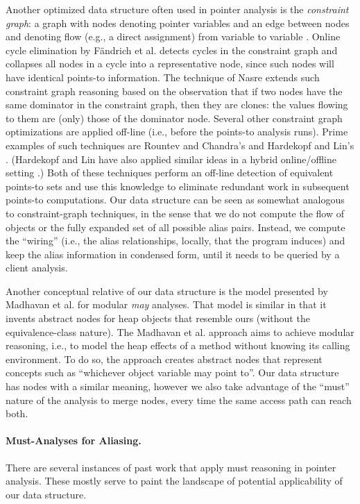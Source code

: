 Another optimized data structure often used in pointer analysis is the
\emph{constraint graph}: a graph with nodes denoting pointer variables
and an edge between nodes  and  denoting flow (e.g., a
direct assignment) from variable  to variable .  Online
cycle elimination by F\"{a}ndrich et al.
\cite{pldi/FahndrichFSA98} detects cycles in the
constraint graph and collapses all nodes in a cycle into a
representative node, since such nodes will have identical points-to
information. The technique of Nasre
\cite{ismm/Nasre12} extends such constraint graph
reasoning based on the observation that if two nodes have the same
dominator in the constraint graph, then they are clones: the values
flowing to them are (only) those of the dominator node. Several other
constraint graph optimizations are applied off-line (i.e., before the
points-to analysis runs).  Prime examples of such techniques are
Rountev and Chandra's \cite{rountevOffline} and Hardekopf and Lin's
\cite{hardekopfOffline}. (Hardekopf and Lin have also applied similar
ideas in a hybrid online/offline setting \cite{antgrasshopper}.)  Both
of these techniques perform an off-line detection of equivalent
points-to sets and use this knowledge to eliminate redundant work in
subsequent points-to computations. Our data structure can be seen as
somewhat analogous to constraint-graph techniques, in the sense that
we do not compute the flow of objects or the fully expanded set of all
possible alias pairs. Instead, we compute the ``wiring'' (i.e., the
alias relationships, locally, that the program induces) and keep the
alias information in condensed form, until it needs to be queried by a
client analysis.

Another conceptual relative of our data structure is the model
presented by Madhavan et al. \cite{PGL-020} for modular \emph{may}
analyses. That model is similar in that it invents abstract nodes for
heap objects that resemble ours (without the equivalence-class
nature). The Madhavan et al. approach aims to achieve modular
reasoning, i.e., to model the heap effects of a method without knowing
its calling environment. To do so, the approach creates abstract
nodes that represent concepts such as ``whichever object variable
 may point to''. Our data structure has nodes with a similar
meaning, however we also take advantage of the ``must'' nature of
the analysis to merge nodes, every time the same access path can
reach both.


\paragraph{Must-Analyses for Aliasing.}
There are several instances of past work that apply must reasoning in
pointer analysis. These mostly serve to paint the landscape of
potential applicability of our data structure.


